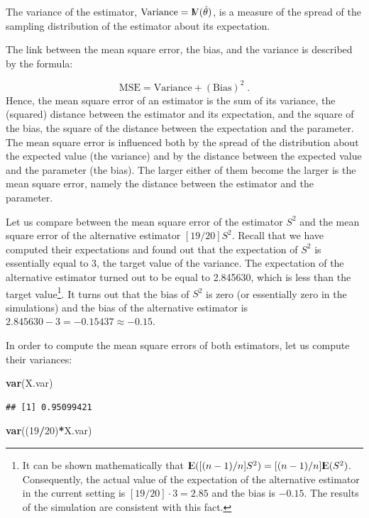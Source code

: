 \documentclass[]{krantz}
\makeatletter
\newenvironment{Shaded}{\begin{snugshade}}{\end{snugshade}}
\newcommand{\DecValTok}[1]{\textcolor[rgb]{0.00,0.00,0.81}{#1}}
\newcommand{\KeywordTok}[1]{\textcolor[rgb]{0.13,0.29,0.53}{\textbf{#1}}}
\newcommand{\NormalTok}[1]{#1}
\newcommand{\OperatorTok}[1]{\textcolor[rgb]{0.81,0.36,0.00}{\textbf{#1}}}
\newcommand{\Expec}{{\rm I\kern-.3em E}}
\newcommand{\Var}{{\rm I\kern-.3em V}}
\newenvironment{kframe}{%
\medskip{}
\setlength{\fboxsep}{.8em}
 \def\at@end@of@kframe{}%
 \ifinner\ifhmode%
  \def\at@end@of@kframe{\end{minipage}}%
  \begin{minipage}{\columnwidth}%
 \fi\fi%
 \def\FrameCommand##1{\hskip\@totalleftmargin \hskip-\fboxsep
 \colorbox{shadecolor}{##1}\hskip-\fboxsep
     \hskip-\linewidth \hskip-\@totalleftmargin \hskip\columnwidth}%
 \MakeFramed {\advance\hsize-\width
   \@totalleftmargin\z@ \linewidth\hsize
   \@setminipage}}%
 {\par\unskip\endMakeFramed%
 \at@end@of@kframe}
\renewenvironment{Shaded}{\begin{kframe}}{\end{kframe}}
\theoremstyle{definition}
\theoremstyle{definition}
\theoremstyle{definition}
\theoremstyle{remark}
\makeatother
\begin{document}
The variance of the estimator, \(\mbox{Variance} = \Var(\hat \theta)\), is
a measure of the spread of the sampling distribution of the estimator
about its expectation.

The link between the mean square error, the bias, and the variance is
described by the formula:

\[\mbox{MSE} = \mbox{Variance} + (\mbox{Bias})^2\;.\] Hence, the mean
square error of an estimator is the sum of its variance, the (squared)
distance between the estimator and its expectation, and the square of
the bias, the square of the distance between the expectation and the
parameter. The mean square error is influenced both by the spread of the
distribution about the expected value (the variance) and by the distance
between the expected value and the parameter (the bias). The larger
either of them become the larger is the mean square error, namely the
distance between the estimator and the parameter.

Let us compare between the mean square error of the estimator \(S^2\) and
the mean square error of the alternative estimator \([19/20] S^2\). Recall
that we have computed their expectations and found out that the
expectation of \(S^2\) is essentially equal to 3, the target value of the
variance. The expectation of the alternative estimator turned out to be
equal to 2.845630, which is less than the target value\footnote{It can be shown mathematically that
  \(\Expec([(n-1)/n] S^2) = [(n-1)/n] \Expec(S^2)\). Consequently, the
  actual value of the expectation of the alternative estimator in the
  current setting is \([19/20]\cdot 3 = 2.85\) and the bias is \(-0.15\).
  The results of the simulation are consistent with this fact.}. It turns
out that the bias of \(S^2\) is zero (or essentially zero in the
simulations) and the bias of the alternative estimator is
\(2.845630 - 3 = -0.15437 \approx -0.15\).

In order to compute the mean square errors of both estimators, let us
compute their variances:

\begin{Shaded}
\begin{Highlighting}[]
\KeywordTok{var}\NormalTok{(X.var)}
\end{Highlighting}
\end{Shaded}

\begin{verbatim}
## [1] 0.95099421
\end{verbatim}

\begin{Shaded}
\begin{Highlighting}[]
\KeywordTok{var}\NormalTok{((}\DecValTok{19}\OperatorTok{/}\DecValTok{20}\NormalTok{)}\OperatorTok{*}\NormalTok{X.var)}
\end{Highlighting}
\end{Shaded}
\end{document}
